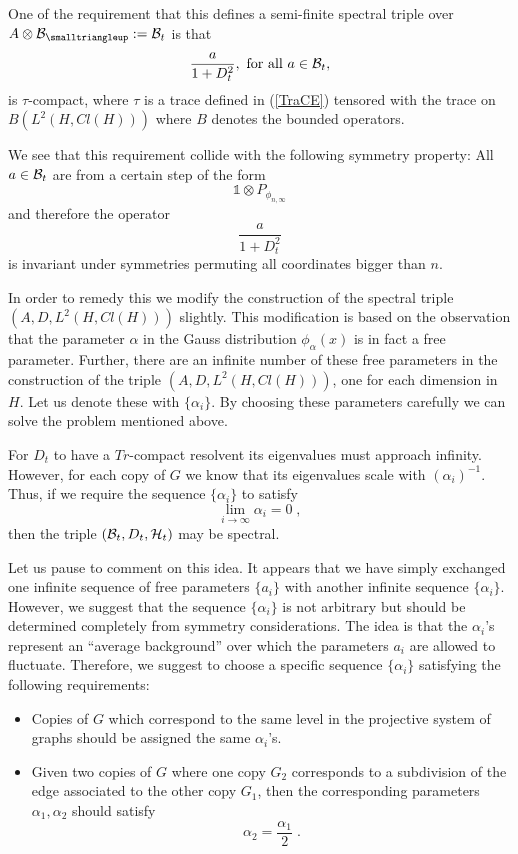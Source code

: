 \documentclass[12pt]{article}
\def\a{\alpha}
\def\t{\tau}
\def\cb{{\cal B}}
\def\ch{{\cal H}}
\begin{document}
One of the requirement that this defines a semi-finite spectral triple over 
$ A \otimes \cb_{\smalltriangleup} :=\cb_t$
is that 
$$\frac{a}{1+D_t^2}, \hbox{ for all } a\in \cb_t,$$
is $\t$-compact, where $\t$ is a trace defined in (\ref{TraCE}) tensored with the trace on $B(L^2(H,Cl(H)))$ where $B$ denotes the bounded operators.

We see that this requirement collide with the following symmetry property: All $a\in \cb_t$ are from a certain step of the form 
$$\mathds{1}\otimes P_{\phi_{n,\infty}}$$
and therefore the operator  
$$\frac{a}{1+D_t^2}$$
is invariant under symmetries permuting all coordinates bigger than $n$.

In order to remedy this we modify the construction of the spectral triple $(A,D,L^2(H,Cl(H)))$ slightly. This modification is based on the observation that the parameter $\a$ in the Gauss distribution $\phi_\a(x)$ is in fact a free parameter. Further, there are an infinite number of these free parameters in the construction of the triple $(A,D,L^2(H,Cl(H)))$, one for each dimension in $H$. Let us denote these with $\{\a_i\}$. By choosing these parameters carefully we can solve the problem mentioned above.

For $D_t$ to have a $Tr$-compact resolvent its eigenvalues must approach infinity. However, for each copy of $G$ we know that its eigenvalues scale with $(\a_i)^{-1}$. Thus, if we require the sequence $\{\a_i\}$ to satisfy 
\[
\lim_{i\rightarrow\infty} \a_i =0\;,
\]
then the triple $(\cb_t,D_t,\ch_t)$ may be spectral.

Let us pause to comment on this idea. It appears that we have simply exchanged one infinite sequence of free parameters $\{a_i\}$ with another infinite sequence $\{\a_i\}$. However, we suggest that the sequence $\{\a_i\}$ is not arbitrary but should be determined completely from symmetry considerations. The idea is that the $\a_i$'s represent an ``average background'' over which the parameters $a_i$ are allowed to fluctuate. Therefore, we suggest to choose a specific sequence $\{\a_i\}$ satisfying the following requirements:
\begin{itemize}
\item 
Copies of $G$ which correspond to the same level in the projective system of graphs should be assigned the same $\a_i$'s.
\item
Given two copies of $G$ where one copy $G_2$ corresponds to a subdivision of the edge associated to the other copy $G_1$, then the corresponding parameters $\a_1,\a_2$ should satisfy
\[
\a_2=\frac{\a_1}{2} \;.
\]
\end{itemize}
\end{document}
